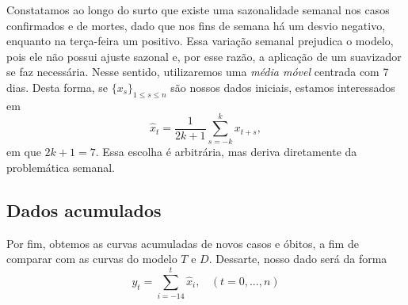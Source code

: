 Constatamos ao longo do surto que existe uma sazonalidade semanal nos casos confirmados e de mortes, dado que nos fins de semana há um desvio negativo, enquanto na terça-feira um positivo. 
Essa variação semanal prejudica o modelo, pois ele não possui ajuste sazonal e, por esse razão, a aplicação de um suavizador se faz necessária. 
Nesse sentido, utilizaremos uma {\em média móvel} centrada com 7 dias.
Desta forma, se  $\{x_s\}_{1 \le s \le n}$ são nossos dados iniciais, estamos interessados em
\begin{equation}
    \hat{x}_t = \frac{1}{2k + 1}\sum_{s=-k}^k x_{t+s},
\end{equation}
em que $2k + 1 = 7$. Essa escolha é arbitrária, mas deriva diretamente da problemática semanal.

\subsection{Dados acumulados}

Por fim, obtemos as curvas acumuladas de novos casos e óbitos, a fim de
comparar com as curvas do modelo $T$ e $D$. Dessarte, nosso dado será da
forma
\begin{equation}
    y_t = \sum_{i=-14}^t \hat{x}_i, ~~~~(t = 0, ..., n)
\end{equation}